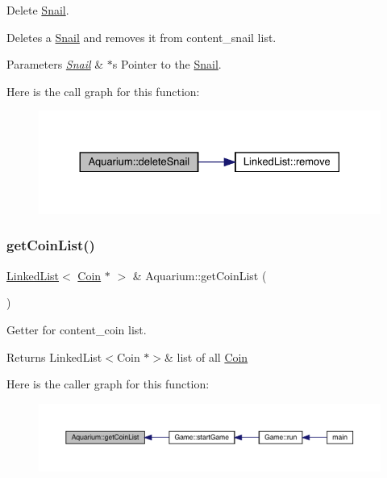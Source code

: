 Delete \mbox{\hyperlink{class_snail}{Snail}}. 

Deletes a \mbox{\hyperlink{class_snail}{Snail}} and removes it from content\+\_\+snail list. 
\begin{DoxyParams}{Parameters}
{\em \mbox{\hyperlink{class_snail}{Snail}}} & $\ast$s Pointer to the \mbox{\hyperlink{class_snail}{Snail}}. \\
\hline
\end{DoxyParams}
Here is the call graph for this function\+:\nopagebreak
\begin{figure}[H]
\begin{center}
\leavevmode
\includegraphics[width=330pt]{class_aquarium_a08048866266aabb12b8cc82bac042c18_cgraph}
\end{center}
\end{figure}
\mbox{\label{class_aquarium_a3b3592004ace881a5e11d19a8dc127e4}} 
\subsubsection{\texorpdfstring{get\+Coin\+List()}{getCoinList()}}
{\footnotesize\ttfamily \mbox{\hyperlink{class_linked_list}{Linked\+List}}$<$ \mbox{\hyperlink{class_coin}{Coin}} $\ast$ $>$ \& Aquarium\+::get\+Coin\+List (\begin{DoxyParamCaption}{ }\end{DoxyParamCaption})}



Getter for content\+\_\+coin list. 

\begin{DoxyReturn}{Returns}
Linked\+List$<$\+Coin $\ast$$>$\& list of all \mbox{\hyperlink{class_coin}{Coin}} 
\end{DoxyReturn}
Here is the caller graph for this function\+:\nopagebreak
\begin{figure}[H]
\begin{center}
\leavevmode
\includegraphics[width=350pt]{class_aquarium_a3b3592004ace881a5e11d19a8dc127e4_icgraph}
\end{center}
\end{figure}
\mbox{\label{class_aquarium_aae7158daf192a78ffaf165285386221f}} 
